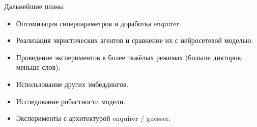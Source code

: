\documentclass[aspectratio=169]{beamer}
\begin{document}
\begin{frame}{Дальнейшие планы}
    \begin{itemize}
        \item Оптимизация гиперпараметров и доработка enquirer.
        \item Реализация эвристических агентов и сравнение их с нейросетевой
              моделью.
        \item Проведение экспериментов в более тяжёлых режимах (больше дикторов,
              меньше слов).
        \item Использование других эмбеддингов.
        \item Исследование робастности модели.
        \item Эксперименты с архитектурой enquirer / guesser.
    \end{itemize}
\end{frame}
\end{document}
